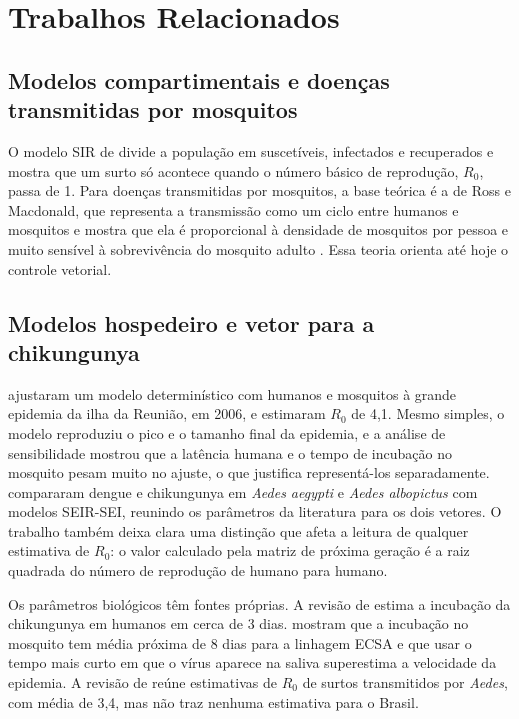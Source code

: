 \section{Trabalhos Relacionados}
\label{sec:trabalhos_relacionados}

\subsection{Modelos compartimentais e doenças transmitidas por mosquitos}

O modelo SIR de  divide a população em suscetíveis, infectados e recuperados e
mostra que um surto só acontece quando o número básico de reprodução, $R_0$, passa de 1. Para doenças
transmitidas por mosquitos, a base teórica é a de Ross e Macdonald, que representa a transmissão como um
ciclo entre humanos e mosquitos e mostra que ela é proporcional à densidade de mosquitos por pessoa e muito
sensível à sobrevivência do mosquito adulto \cite{smith2012}. Essa teoria orienta até hoje o controle
vetorial.

\subsection{Modelos hospedeiro e vetor para a chikungunya}

 ajustaram um modelo determinístico com humanos e mosquitos à grande epidemia da ilha
da Reunião, em 2006, e estimaram $R_0$ de 4,1. Mesmo simples, o modelo reproduziu o pico e o tamanho final
da epidemia, e a análise de sensibilidade mostrou que a latência humana e o tempo de incubação no mosquito
pesam muito no ajuste, o que justifica representá-los separadamente.  compararam
dengue e chikungunya em \textit{Aedes aegypti} e \textit{Aedes albopictus} com modelos SEIR-SEI,
reunindo os parâmetros da literatura para os dois vetores. O trabalho também deixa clara uma distinção
que afeta a leitura de qualquer estimativa de $R_0$: o valor calculado pela matriz de próxima geração é a
raiz quadrada do número de reprodução de humano para humano.

Os parâmetros biológicos têm fontes próprias. A revisão de  estima a incubação da
chikungunya em humanos em cerca de 3 dias.  mostram que a incubação no
mosquito tem média próxima de 8 dias para a linhagem ECSA e que usar o tempo mais curto em que o vírus
aparece na saliva superestima a velocidade da epidemia. A revisão de  reúne
estimativas de $R_0$ de surtos transmitidos por \textit{Aedes}, com média de 3,4, mas não traz nenhuma
estimativa para o Brasil.

